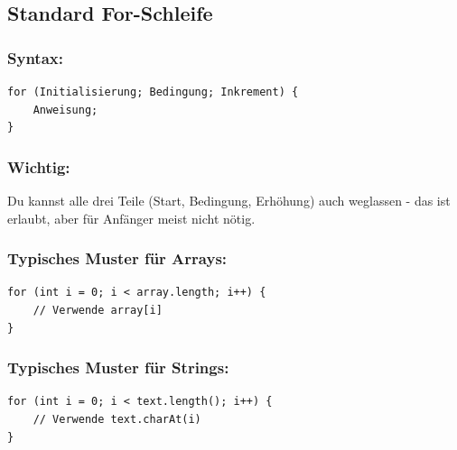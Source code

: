 \newpage


\subsection*{Standard For-Schleife}

\subsubsection*{Syntax:}
\begin{lstlisting}
for (Initialisierung; Bedingung; Inkrement) {
    Anweisung;
}
\end{lstlisting}

\subsubsection*{Wichtig:} Du kannst alle drei Teile (Start, Bedingung, Erhöhung) auch weglassen - das ist erlaubt, aber für Anfänger meist nicht nötig.

\subsubsection*{Typisches Muster für Arrays:}
\begin{lstlisting}
for (int i = 0; i < array.length; i++) {
    // Verwende array[i]
}
\end{lstlisting}

\subsubsection*{Typisches Muster für Strings:}
\begin{lstlisting}
for (int i = 0; i < text.length(); i++) {
    // Verwende text.charAt(i)
}
\end{lstlisting}

